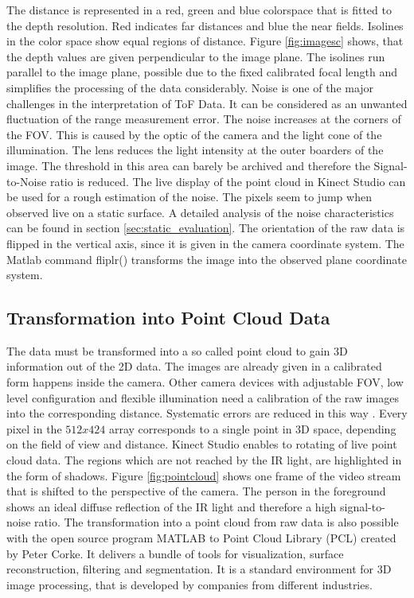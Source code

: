 The distance is represented in a red, green and blue colorspace that is fitted to the depth resolution. Red indicates far distances and blue the near fields. Isolines in the color space show equal regions of distance. Figure \ref{fig:imagesc} shows, that the depth values are given perpendicular to the image plane. The isolines run parallel to the image plane, possible due to the fixed calibrated focal length and simplifies the processing of the data considerably.
Noise is one of the major challenges in the interpretation of ToF Data. It can be considered as an unwanted fluctuation of the range measurement error. The noise increases at the corners of the FOV. This is caused by the optic of the camera and the light cone of the illumination. The lens reduces the light intensity at the outer boarders of the image. The threshold in this area can barely be archived and therefore the Signal-to-Noise ratio is reduced. The live display of the point cloud in Kinect Studio can be used for a rough estimation of the noise. The pixels seem to jump when observed live on a static surface. A detailed analysis of the noise characteristics can be found in section \ref{sec:static_evaluation}. The orientation of the raw data is flipped in the vertical axis, since it is given in the camera coordinate system. The Matlab command fliplr() transforms the image into the observed plane coordinate system.

\subsection{Transformation into Point Cloud Data}
The data must be transformed into a so called point cloud to gain 3D information out of the 2D data. The images are already given in a calibrated form happens inside the camera. Other camera devices with adjustable FOV, low level configuration and flexible illumination need a calibration of the raw images into the corresponding distance. Systematic errors are reduced in this way \cite{lindner2010time} \cite{lefloch2013technical}. Every pixel in the $512x424$ array corresponds to a single point in 3D space, depending on the field of view and distance. Kinect Studio enables to rotating of live point cloud data. The regions which are not reached by the IR light, are highlighted in the form of shadows. Figure \ref{fig:pointcloud} shows one frame of the video stream that is shifted to the perspective of the camera. The person in the foreground shows an ideal diffuse reflection of the IR light and therefore a high signal-to-noise ratio. The transformation into a point cloud from raw data is also possible with the open source program MATLAB to Point Cloud Library (PCL) created by Peter Corke. It delivers a bundle of tools for visualization, surface reconstruction, filtering and segmentation. It is a standard environment for 3D image processing, that is developed by companies from different industries.

